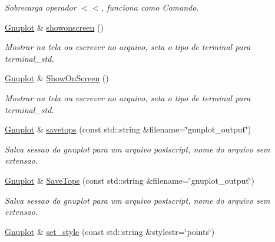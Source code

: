 \begin{DoxyCompactItemize}
\begin{DoxyCompactList}\small\item\em Sobrecarga operador $<$$<$, funciona como Comando. \end{DoxyCompactList}\item 
\hypertarget{classGnuplot_a356d2faaa79f08d13fec9718b776b28d}{\hyperlink{classGnuplot}{Gnuplot} \& \hyperlink{classGnuplot_a356d2faaa79f08d13fec9718b776b28d}{showonscreen} ()}\label{classGnuplot_a356d2faaa79f08d13fec9718b776b28d}

\begin{DoxyCompactList}\small\item\em Mostrar na tela ou escrever no arquivo, seta o tipo de terminal para terminal\-\_\-std. \end{DoxyCompactList}\item 
\hypertarget{classGnuplot_aee70cb6dfc893d6f19976fa9042c8e7c}{\hyperlink{classGnuplot}{Gnuplot} \& \hyperlink{classGnuplot_aee70cb6dfc893d6f19976fa9042c8e7c}{Show\-On\-Screen} ()}\label{classGnuplot_aee70cb6dfc893d6f19976fa9042c8e7c}

\begin{DoxyCompactList}\small\item\em Mostrar na tela ou escrever no arquivo, seta o tipo de terminal para terminal\-\_\-std. \end{DoxyCompactList}\item 
\hypertarget{classGnuplot_a032072c7c01b508a7535a17fb08562b1}{\hyperlink{classGnuplot}{Gnuplot} \& \hyperlink{classGnuplot_a032072c7c01b508a7535a17fb08562b1}{savetops} (const std\-::string \&filename=\char`\"{}gnuplot\-\_\-output\char`\"{})}\label{classGnuplot_a032072c7c01b508a7535a17fb08562b1}

\begin{DoxyCompactList}\small\item\em Salva sessao do gnuplot para um arquivo postscript, nome do arquivo sem extensao. \end{DoxyCompactList}\item 
\hypertarget{classGnuplot_a5adf74dfda6d9d70a16c435fedf07625}{\hyperlink{classGnuplot}{Gnuplot} \& \hyperlink{classGnuplot_a5adf74dfda6d9d70a16c435fedf07625}{Save\-Tops} (const std\-::string \&filename=\char`\"{}gnuplot\-\_\-output\char`\"{})}\label{classGnuplot_a5adf74dfda6d9d70a16c435fedf07625}

\begin{DoxyCompactList}\small\item\em Salva sessao do gnuplot para um arquivo postscript, nome do arquivo sem extensao. \end{DoxyCompactList}\item 
\hypertarget{classGnuplot_acfdcda292650775ebed4683e8e1515b5}{\hyperlink{classGnuplot}{Gnuplot} \& \hyperlink{classGnuplot_acfdcda292650775ebed4683e8e1515b5}{set\-\_\-style} (const std\-::string \&stylestr=\char`\"{}points\char`\"{})}\label{classGnuplot_acfdcda292650775ebed4683e8e1515b5}


\end{DoxyCompactItemize}
